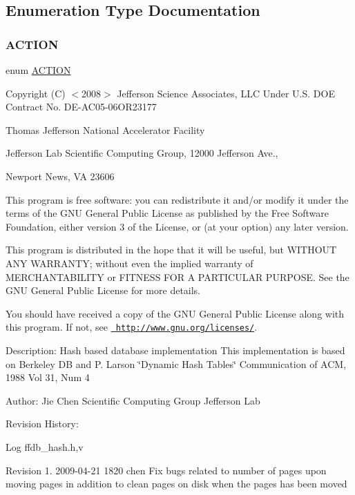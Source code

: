 \subsection{Enumeration Type Documentation}
\mbox{\label{adat-devel_2other__libs_2filedb_2filehash_2ffdb__hash_8h_ae3a6b7e1199f276d75597e986e42c1a3}} 
\subsubsection{\texorpdfstring{ACTION}{ACTION}}
{\footnotesize\ttfamily enum \mbox{\hyperlink{adat-devel_2other__libs_2filedb_2filehash_2ffdb__hash_8h_ae3a6b7e1199f276d75597e986e42c1a3}{A\+C\+T\+I\+ON}}}

Copyright (C) $<$2008$>$ Jefferson Science Associates, L\+LC Under U.\+S. D\+OE Contract No. D\+E-\/\+A\+C05-\/06\+O\+R23177

Thomas Jefferson National Accelerator Facility

Jefferson Lab Scientific Computing Group, 12000 Jefferson Ave.,

Newport News, VA 23606

This program is free software\+: you can redistribute it and/or modify it under the terms of the G\+NU General Public License as published by the Free Software Foundation, either version 3 of the License, or (at your option) any later version.

This program is distributed in the hope that it will be useful, but W\+I\+T\+H\+O\+UT A\+NY W\+A\+R\+R\+A\+N\+TY; without even the implied warranty of M\+E\+R\+C\+H\+A\+N\+T\+A\+B\+I\+L\+I\+TY or F\+I\+T\+N\+E\+SS F\+OR A P\+A\+R\+T\+I\+C\+U\+L\+AR P\+U\+R\+P\+O\+SE. See the G\+NU General Public License for more details.

You should have received a copy of the G\+NU General Public License along with this program. If not, see \href{http://www.gnu.org/licenses/}{\texttt{ http\+://www.\+gnu.\+org/licenses/}}. 

 Description\+: Hash based database implementation This implementation is based on Berkeley DB and P. Larson \char`\"{}\+Dynamic Hash Tables\char`\"{} Communication of A\+CM, 1988 Vol 31, Num 4

Author\+: Jie Chen Scientific Computing Group Jefferson Lab

Revision History\+: \begin{DoxyParagraph}{Log}
ffdb\+\_\+hash.\+h,v 
\end{DoxyParagraph}
Revision 1. 2009-\/04-\/21 1820 chen Fix bugs related to number of pages upon moving pages in addition to clean pages on disk when the pages has been moved

